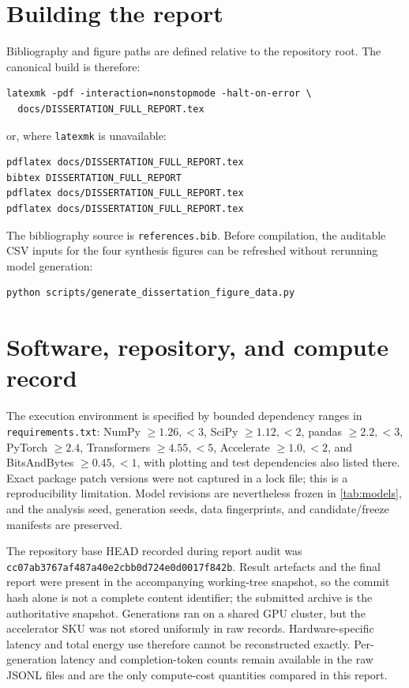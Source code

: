 \documentclass[11pt,twoside,a4paper]{report}
\begin{document}
\section{Building the report}

Bibliography and figure paths are defined relative to the repository root.  The
canonical build is therefore:
\begin{verbatim}
latexmk -pdf -interaction=nonstopmode -halt-on-error \
  docs/DISSERTATION_FULL_REPORT.tex
\end{verbatim}
or, where \texttt{latexmk} is unavailable:
\begin{verbatim}
pdflatex docs/DISSERTATION_FULL_REPORT.tex
bibtex DISSERTATION_FULL_REPORT
pdflatex docs/DISSERTATION_FULL_REPORT.tex
pdflatex docs/DISSERTATION_FULL_REPORT.tex
\end{verbatim}
The bibliography source is \texttt{references.bib}.  Before
compilation, the auditable CSV inputs for the four synthesis figures can be refreshed
without rerunning model generation:
\begin{verbatim}
python scripts/generate_dissertation_figure_data.py
\end{verbatim}

\section{Software, repository, and compute record}

The execution environment is specified by bounded dependency ranges in
\texttt{requirements.txt}: NumPy $\geq1.26,<3$, SciPy $\geq1.12,<2$, pandas
$\geq2.2,<3$, PyTorch $\geq2.4$, Transformers $\geq4.55,<5$, Accelerate
$\geq1.0,<2$, and BitsAndBytes $\geq0.45,<1$, with plotting and test dependencies
also listed there.  Exact package patch versions were not captured in a lock file;
this is a reproducibility limitation.  Model revisions are nevertheless frozen in
\cref{tab:models}, and the analysis seed, generation seeds, data fingerprints, and
candidate/freeze manifests are preserved.

The repository base HEAD recorded during report audit was
\texttt{cc07ab3767af487a40e2cbb0d724e0d0017f842b}.  Result artefacts and the final
report were present in the accompanying working-tree snapshot, so the commit hash
alone is not a complete content identifier; the submitted archive is the
authoritative snapshot.  Generations ran on a shared GPU cluster, but the accelerator
SKU was not stored uniformly in raw records.  Hardware-specific latency and total
energy use therefore cannot be reconstructed exactly.  Per-generation latency and
completion-token counts remain available in the raw JSONL files and are the only
compute-cost quantities compared in this report.
\end{document}
